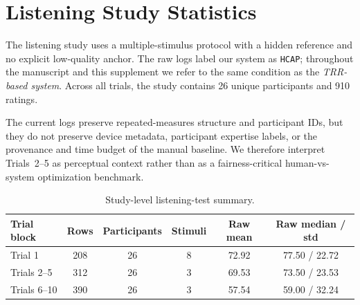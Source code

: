 \documentclass{article}
\begin{document}
\section{Listening Study Statistics}

The listening study uses a multiple-stimulus protocol with a hidden reference and no explicit low-quality anchor. The raw logs label our system as \texttt{HCAP}; throughout the manuscript and this supplement we refer to the same condition as the \emph{TRR-based system}. Across all trials, the study contains 26 unique participants and 910 ratings.

The current logs preserve repeated-measures structure and participant IDs, but they do not preserve device metadata, participant expertise labels, or the provenance and time budget of the manual baseline. We therefore interpret Trials~2--5 as perceptual context rather than as a fairness-critical human-vs-system optimization benchmark.

\begin{table}[htbp]
	\centering
	\caption{Study-level listening-test summary.}
	\label{tab:listening_overview}
	\small
	\begin{tabular}{lccccc}
		\toprule
		\textbf{Trial block} & \textbf{Rows} & \textbf{Participants} & \textbf{Stimuli} & \textbf{Raw mean} & \textbf{Raw median / std} \\
		\midrule
		Trial 1 & 208 & 26 & 8 & 72.92 & 77.50 / 22.72 \\
		Trials 2--5 & 312 & 26 & 3 & 69.53 & 73.50 / 23.53 \\
		Trials 6--10 & 390 & 26 & 3 & 57.54 & 59.00 / 32.24 \\
		\bottomrule
	\end{tabular}
\end{table}
\end{document}
